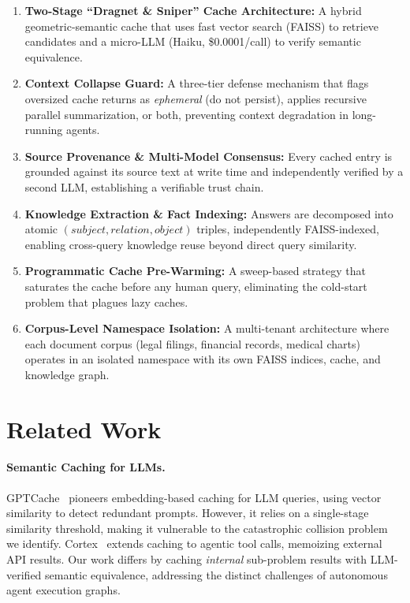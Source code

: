 \documentclass[11pt,twocolumn]{article}
\begin{document}
\begin{enumerate}
    \item \textbf{Two-Stage ``Dragnet \& Sniper'' Cache Architecture:} A hybrid geometric-semantic cache that uses fast vector search (FAISS) to retrieve candidates and a micro-LLM (Haiku, \$0.0001/call) to verify semantic equivalence.

    \item \textbf{Context Collapse Guard:} A three-tier defense mechanism that flags oversized cache returns as \textit{ephemeral} (do not persist), applies recursive parallel summarization, or both, preventing context degradation in long-running agents.

    \item \textbf{Source Provenance \& Multi-Model Consensus:} Every cached entry is grounded against its source text at write time and independently verified by a second LLM, establishing a verifiable trust chain.

    \item \textbf{Knowledge Extraction \& Fact Indexing:} Answers are decomposed into atomic $(subject, relation, object)$ triples, independently FAISS-indexed, enabling cross-query knowledge reuse beyond direct query similarity.

    \item \textbf{Programmatic Cache Pre-Warming:} A sweep-based strategy that saturates the cache before any human query, eliminating the cold-start problem that plagues lazy caches.

    \item \textbf{Corpus-Level Namespace Isolation:} A multi-tenant architecture where each document corpus (legal filings, financial records, medical charts) operates in an isolated namespace with its own FAISS indices, cache, and knowledge graph.
\end{enumerate}

\section{Related Work}
\label{sec:related}

\paragraph{Semantic Caching for LLMs.}
GPTCache~\cite{bang2023gptcache} pioneers embedding-based caching for LLM queries, using vector similarity to detect redundant prompts. However, it relies on a single-stage similarity threshold, making it vulnerable to the catastrophic collision problem we identify. Cortex~\cite{arteaga2024cortex} extends caching to agentic tool calls, memoizing external API results. Our work differs by caching \textit{internal} sub-problem results with LLM-verified semantic equivalence, addressing the distinct challenges of autonomous agent execution graphs.
\end{document}
